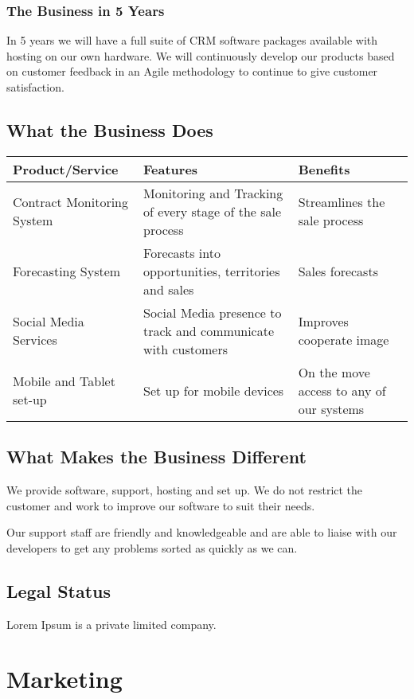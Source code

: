 \documentclass[DIV=calc, paper=a4, fontsize=11pt]{scrartcl}	 %
\begin{document}
\subsubsection*{The Business in 5 Years}
In 5 years we will have a full suite of CRM software packages available with hosting on our own
hardware. We will continuously develop our products based on customer feedback in an Agile 
methodology to continue to give customer satisfaction.

\subsection{What the Business Does}
\begin{tabular}{|l|p{}|p{}|}\hline
Product/Service & Features & Benefits \\ \hline
Contract Monitoring System & Monitoring and Tracking of every stage of the sale process & Streamlines the sale process \\ \hline
Forecasting System & Forecasts into opportunities, territories and sales & Sales forecasts \\ \hline
Social Media Services & Social Media presence to track and communicate with customers & Improves cooperate image \\ \hline
Mobile and Tablet set-up & Set up for mobile devices & On the move access to any of our systems \\ \hline
\end{tabular}


\subsection{What Makes the Business Different}
We provide software, support, hosting and set up. We do not restrict the customer and work to 
improve our software to suit their needs.

Our support staff are friendly and knowledgeable and are able to liaise with our developers to get
any problems sorted as quickly as we can.


\subsection{Legal Status}
Lorem Ipsum is a private limited company.

\section{Marketing}
\end{document}
